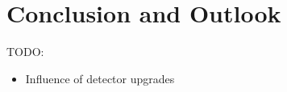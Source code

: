 
\chapter{Conclusion and Outlook} %

\label{Chapter6} %


TODO:
\begin{itemize}
	\item Influence of detector upgrades
\end{itemize}
\label{sec:conclusion}
